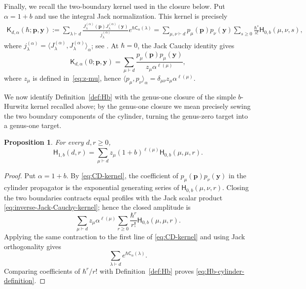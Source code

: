 \documentclass[11pt,a4paper,reqno]{article}
\newtheorem{proposition}[theorem]{Proposition}
\theoremstyle{definition}
\theoremstyle{remark}
\newcommand\cA{{\mathsf C}}
\newcommand\Hb{{\mathsf H}}
\newcommand\ellpart{{\ell}}
\begin{document}
Finally, we recall the two-boundary kernel used in the closure below.  Put $\alpha=1+b$ and use the integral Jack normalization.  This kernel is precisely
\begin{equation}\label{eq:CD-kernel}
\begin{aligned}
\mathsf K_{d,\alpha}(\hbar;\mathbf p,\mathbf y):=\sum_{\lambda\vdash d}\frac{J_\lambda^{(\alpha)}(\mathbf p)J_\lambda^{(\alpha)}(\mathbf y)}{j_\lambda^{(\alpha)}} e^{\hbar\cA_\alpha(\lambda)}=\sum_{\mu,\nu\vdash d}p_\mu(\mathbf p)p_\nu(\mathbf y)\sum_{s\geq0}\frac{\hbar^s}{s!}\Hb_{0,b}(\mu,\nu,s),
\end{aligned}
\end{equation}
where $j_\lambda^{(\alpha)}=\langle J_\lambda^{(\alpha)},J_\lambda^{(\alpha)}\rangle_\alpha$; see \cite[Equation~(63) and Theorem~6.4]{ChapuyDolega22}.  At $\hbar=0$, the Jack Cauchy identity gives
\begin{equation}\label{eq:inverse-Jack-Cauchy-kernel}
\mathsf K_{d,\alpha}(0;\mathbf p,\mathbf y) =\sum_{\mu\vdash d}\frac{p_\mu(\mathbf p)p_\mu(\mathbf y)}{z_\mu\alpha^{\ellpart(\mu)}},
\end{equation}
where $z_\mu$ is defined in~\eqref{eq:z-mu}, hence $\langle p_\mu,p_\nu\rangle_\alpha =\delta_{\mu\nu}z_\mu\alpha^{\ellpart(\mu)}.$


We now identify Definition~\ref{def:Hb} with the genus-one closure of the simple $b$-Hurwitz kernel recalled above; by the genus-one closure we mean precisely sewing the two boundary components of the cylinder, turning the genus-zero target into a genus-one target.

\begin{proposition}\label{prop:cylinder-closure}
For every $d,r\geq0$,
\begin{equation}\label{eq:Hb-cylinder-definition}
\Hb_{1,b}(d,r)=\sum_{\mu\vdash d}z_\mu(1+b)^{\ellpart(\mu)}\Hb_{0,b}(\mu,\mu,r).
\end{equation}
\end{proposition}

\begin{proof}
Put $\alpha=1+b$.  By \eqref{eq:CD-kernel}, the coefficient of $p_\mu(\mathbf p)p_\nu(\mathbf y)$ in the cylinder propagator is the exponential generating series of $\Hb_{0,b}(\mu,\nu,r)$.  Closing the two boundaries contracts equal profiles with the Jack scalar product \eqref{eq:inverse-Jack-Cauchy-kernel}; hence the closed amplitude is
\[
\sum_{\mu\vdash d}z_\mu\alpha^{\ellpart(\mu)} \sum_{r\geq0}\frac{\hbar^r}{r!}\Hb_{0,b}(\mu,\mu,r).
\]
Applying the same contraction to the first line of \eqref{eq:CD-kernel} and using Jack orthogonality gives
\[
\sum_{\lambda\vdash d}e^{\hbar\cA_\alpha(\lambda)}.
\]
Comparing coefficients of $\hbar^r/r!$ with Definition~\ref{def:Hb} proves \eqref{eq:Hb-cylinder-definition}.
\end{proof}
\end{document}
